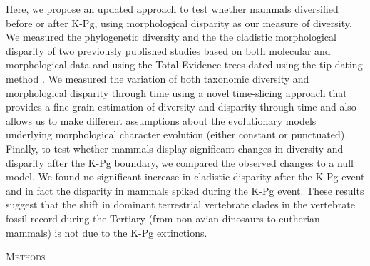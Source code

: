 \documentclass[12pt,letterpaper]{article}
\renewcommand{\section}[1]{%
\bigskip
\begin{center}
\begin{Large}
\normalfont\scshape #1
\medskip
\end{Large}
\end{center}}
\begin{document}
Here, we propose an updated approach to test whether mammals diversified before or after K-Pg, using morphological disparity as our measure of diversity.
We measured the phylogenetic diversity and the the cladistic morphological disparity of two previously published studies \cite{Slater2012MEE,beckancient2014} based on both molecular and morphological data and using the Total Evidence trees dated using the tip-dating method \cite{ronquista2012,Wood01032013}.
We measured the variation of both taxonomic diversity and morphological disparity through time using a novel time-slicing approach that provides a fine grain estimation of diversity and disparity through time and also allows us to make different assumptions about the evolutionary models underlying morphological character evolution (either constant or punctuated). 
Finally, to test whether mammals display significant changes in diversity and disparity after the K-Pg boundary, we compared the observed changes to a null model. 
We found no significant increase in cladistic disparity after the K-Pg event and in fact the disparity in mammals spiked during the K-Pg event. 
These results suggest that the shift in dominant terrestrial vertebrate clades in the vertebrate fossil record during the Tertiary (from non-avian dinosaurs to eutherian mammals) is not due to the K-Pg extinctions.

%
%

\section{Methods}

\end{document}
